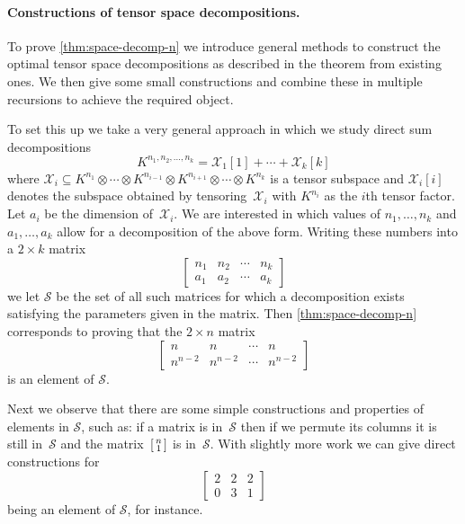 \documentclass[11pt]{article}
\theoremstyle{definition}
\theoremstyle{remark}
\begin{document}
\paragraph{Constructions of tensor space decompositions.}

To prove 
\autoref{thm:space-decomp-n} we introduce general methods to construct the optimal tensor space decompositions as described in the theorem from existing ones. We then give some small constructions and combine these in multiple recursions to achieve the required object.

To set this up we take a very general approach in which we study direct sum decompositions 
\[
K^{n_1, n_2, \ldots, n_k} = \mathcal{X}_1[1] + \cdots + \mathcal{X}_k[k]
\]
where $\mathcal{X}_i \subseteq K^{n_1} \otimes \cdots \otimes K^{n_{i-1}} \otimes K^{n_{i+1}} \otimes \cdots \otimes K^{n_k}$ is a tensor subspace and $\mathcal{X}_i[i]$ denotes the subspace obtained by tensoring~$\mathcal{X}_i$ with $K^{n_i}$ as the $i$th tensor factor. Let $a_i$ be the dimension of~$\mathcal{X}_i$. We are interested in which values of $n_1, \ldots, n_k$ and $a_1, \ldots, a_k$ allow for a decomposition of the above form. Writing these numbers into a $2\times k$ matrix
\[
\begin{bmatrix} n_1 & n_2 & \cdots & n_k\\a_1 & a_2  & \cdots & a_k\end{bmatrix}
\]
we let $\mathcal{S}$ be the set of all such matrices for which a decomposition exists satisfying the parameters given in the matrix. Then \autoref{thm:space-decomp-n} corresponds to proving that the $2 \times n$ matrix
\begin{equation}\label{eq:base-case-n-intro}
\begin{bmatrix} n & n & \cdots & n\\n^{n-2} & n^{n-2}  & \cdots & n^{n-2}\end{bmatrix}
\end{equation}
is an element of $\mathcal{S}$. 

Next we observe that there are some simple constructions and properties of elements in $\mathcal{S}$, such as: if a matrix is in~$\mathcal{S}$ then if we permute its columns it is still in~$\mathcal{S}$ and the matrix~$\begin{bsmallmatrix} n\\1 \end{bsmallmatrix}$ is in~$\mathcal{S}$. With slightly more work we can give direct constructions for
\begin{equation}\label{eq:base-case-intro}
\begin{bmatrix} 2 & 2 & 2\\0 & 3 & 1\end{bmatrix}
\end{equation}
being an element of $\mathcal{S}$, for instance.
\end{document}
